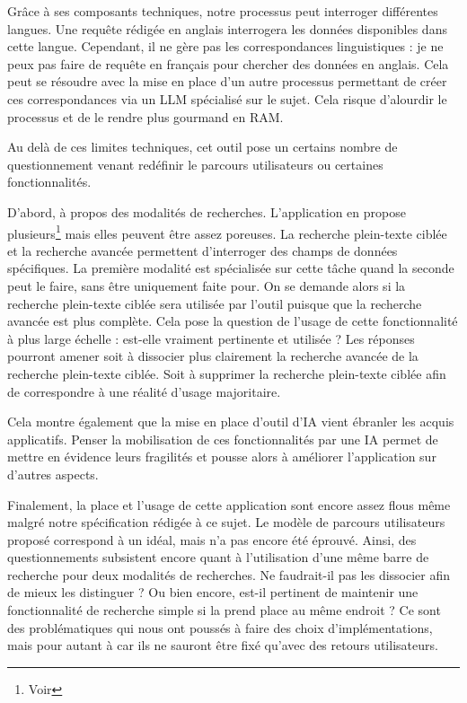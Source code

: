Grâce à ses composants techniques, notre processus peut interroger différentes langues. Une requête rédigée en anglais interrogera les données disponibles dans cette langue. Cependant, il ne gère pas les correspondances linguistiques : je ne peux pas faire de requête en français pour chercher des données en anglais. Cela peut se résoudre avec la mise en place d'un autre processus permettant de créer ces correspondances via un \gls{LLM} spécialisé sur le sujet. Cela risque d'alourdir le processus et de le rendre plus gourmand en \gls{RAM}.\newline

Au delà de ces limites techniques, cet outil pose un certains nombre de questionnement venant redéfinir le parcours utilisateurs ou certaines fonctionnalités. 

D'abord, à propos des modalités de recherches. L'application en propose plusieurs\footnote{Voir } mais elles peuvent être assez poreuses. La recherche plein-texte ciblée et la recherche avancée permettent d'interroger des champs de données spécifiques. La première modalité est spécialisée sur cette tâche quand la seconde peut le faire, sans être uniquement faite pour. On se demande alors si la recherche plein-texte ciblée sera utilisée par l'outil puisque que la recherche avancée est plus complète. Cela pose la question de l'usage de cette fonctionnalité à plus large échelle : est-elle vraiment pertinente et utilisée ? Les réponses pourront amener soit à dissocier plus clairement la recherche avancée de la recherche plein-texte ciblée. Soit à supprimer la recherche plein-texte ciblée afin de correspondre à une réalité d'usage majoritaire. 

Cela montre également que la mise en place d'outil d'\gls{IA} vient ébranler les acquis applicatifs. Penser la mobilisation de ces fonctionnalités par une \gls{IA} permet de mettre en évidence leurs fragilités et pousse alors à améliorer l'application sur d'autres aspects.\newline

Finalement, la place et l'usage de cette application sont encore assez flous même malgré notre spécification rédigée à ce sujet. Le modèle de parcours utilisateurs proposé correspond à un idéal, mais n'a pas encore été éprouvé. Ainsi, des questionnements subsistent encore quant à l'utilisation d'une même barre de recherche pour deux modalités de recherches. Ne faudrait-il pas les dissocier afin de mieux les distinguer ? Ou bien encore, est-il pertinent de maintenir une fonctionnalité de recherche simple si la  prend place au même endroit ? Ce sont des problématiques qui nous ont poussés à faire des choix d'implémentations, mais pour autant à  car ils ne sauront être fixé qu'avec des retours utilisateurs.

